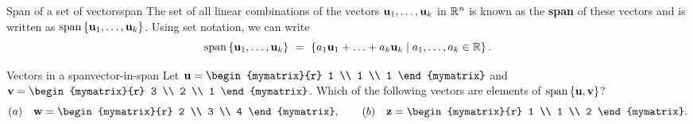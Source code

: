 \begin{definition}{Span of a set of vectors}{span}
  The set of all linear combinations of the vectors
  $\vect{u}_1, \ldots ,\vect{u}_k$ in $\mathbb{R}^n$ is known as the
  \textbf{span} of these vectors and is written
  as $\sspan\set{\vect{u}_1,\ldots,\vect{u}_k}$. Using set notation,
  we can write
  \begin{equation*}
    \sspan\set{\vect{u}_1,\ldots,\vect{u}_k}
    ~=~ \set{a_1\vect{u}_1+\ldots+a_k\vect{u}_k \mid a_1,\ldots,a_k\in\R}.
  \end{equation*}
\end{definition}

\begin{example}{Vectors in a span}{vector-in-span}
  Let $\vect{u}=\begin{mymatrix}{r} 1 \\ 1 \\ 1 \end{mymatrix}$ and
  $\vect{v}=\begin{mymatrix}{r} 3 \\ 2 \\ 1 \end{mymatrix}$. Which
  of the following vectors are elements of
  $\sspan\set{\vect{u},\vect{v}}$?
  \begin{equation*}
    (a)\quad\vect{w} = \begin{mymatrix}{r} 2 \\ 3 \\ 4 \end{mymatrix},
    \qquad
    (b)\quad\vect{z} = \begin{mymatrix}{r} 1 \\ 1 \\ 2 \end{mymatrix}.
  \end{equation*}
\end{example}

